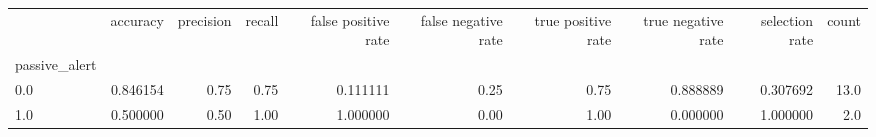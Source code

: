 \begin{tabular}{lrrrrrrrrr}
\toprule
{} &  accuracy &  precision &  recall &  false positive rate &  false negative rate &  true positive rate &  true negative rate &  selection rate &  count \\
passive\_alert &           &            &         &                      &                      &                     &                     &                 &        \\
\midrule
0.0           &  0.846154 &       0.75 &    0.75 &             0.111111 &                 0.25 &                0.75 &            0.888889 &        0.307692 &   13.0 \\
1.0           &  0.500000 &       0.50 &    1.00 &             1.000000 &                 0.00 &                1.00 &            0.000000 &        1.000000 &    2.0 \\
\bottomrule
\end{tabular}
